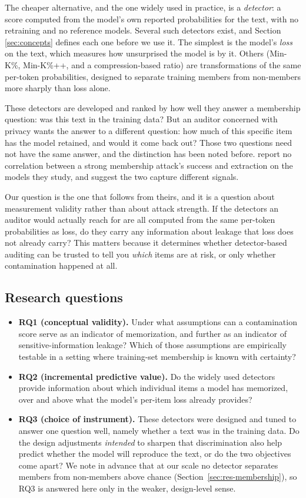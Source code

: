 The cheaper alternative, and the one widely used in practice, is a \emph{detector}: a
score computed from the model's own reported probabilities for the text, with no
retraining and no reference models. Several such detectors exist, and Section
\ref{sec:concepts} defines each one before we use it. The simplest is the model's
\emph{loss} on the text, which measures how unsurprised the model is by it. Others
(Min-K\%, Min-K\%++, and a compression-based ratio) are transformations of the same
per-token probabilities, designed to separate training members from non-members more
sharply than loss alone.

These detectors are developed and ranked by how well they answer a membership question:
was this text in the training data? But an auditor concerned with privacy wants the
answer to a different question: how much of this specific item has the model retained,
and would it come back out? Those two questions need not have the same answer, and the
distinction has been noted before. \citet{hayes2025strong} report no correlation between
a strong membership attack's success and extraction on the models they study, and
suggest the two capture different signals.

Our question is the one that follows from theirs, and it is a question about measurement
validity rather than about attack strength. If the detectors an auditor would actually
reach for are all computed from the same per-token probabilities as loss, do they carry
any information about leakage that loss does not already carry? This matters because it
determines whether detector-based auditing can be trusted to tell you \emph{which} items
are at risk, or only whether contamination happened at all.

\subsection{Research questions}
\begin{itemize}
 \item \textbf{RQ1 (conceptual validity).} Under what assumptions can a contamination
 score serve as an indicator of memorization, and further as an indicator of
 sensitive-information leakage? Which of those assumptions are empirically testable in a
 setting where training-set membership is known with certainty?
 \item \textbf{RQ2 (incremental predictive value).} Do the widely used detectors provide
 information about which individual items a model has memorized, over and above what the
 model's per-item loss already provides?
 \item \textbf{RQ3 (choice of instrument).} These detectors were designed and tuned to
 answer one question well, namely whether a text was in the training data. Do the design
 adjustments \emph{intended} to sharpen that discrimination also help predict whether the
 model will reproduce the text, or do the two objectives come apart? We note in advance
 that at our scale no detector separates members from non-members above chance
 (Section~\ref{sec:res-membership}), so RQ3 is answered here only in the weaker,
 design-level sense.
\end{itemize}

